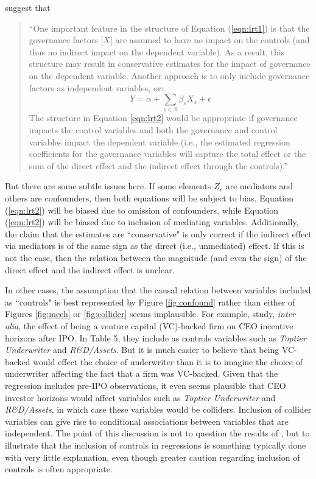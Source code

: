 \documentclass[11pt,reqno]{amsart}
\begin{document}
\citet{Larcker:2011bw} suggest that 
\begin{quote}
``One important feature in the structure of Equation (\ref{eqn:lrt1}) is that the governance factors [$X$] are assumed to have no impact on the controls (and thus no indirect impact on the dependent variable). 
As a result, this structure may result in conservative estimates for the impact of governance on the dependent variable. Another approach is to only include governance factors as independent variables, or:
\begin{equation}
Y = \alpha + \sum_{s \in S} \beta_s X_s + \epsilon \label{eqn:lrt2}
\end{equation}
The structure in Equation \ref{eqn:lrt2} would be appropriate if governance impacts the control variables and both the governance and control variables impact the dependent variable (i.e., the estimated regression coefficients for the governance variables will capture the total effect or the sum of the direct effect and the indirect effect through the controls).''
\end{quote}

But there are some subtle issues here.
If some elements $Z_r$ are mediators and others are confounders, then both equations will be subject to bias. 
Equation (\ref{eqn:lrt2}) will be biased due to omission of confounders, while Equation (\ref{eqn:lrt2})  will be biased due to inclusion of mediating variables.
Additionally, the claim that the estimates are ``conservative" is only correct if the indirect effect via mediators is of the same sign as the direct (i.e., unmediated) effect. 
If this is not the case, then the relation between the magnitude (and even the sign) of the direct effect and the indirect effect is unclear.

In other cases, the assumption that the causal relation between variables included as ``controls" is best represented by Figure \ref{fig:confound} rather than either of Figures \ref{fig:mech} or \ref{fig:collider} seems implausible.
For example, \citet{Cadman:2014cr} study, \emph{inter alia}, the effect of being a venture capital (VC)-backed firm on CEO incentive horizons after IPO.
In Table 5, they include as controls variables such as \emph{Toptier Underwriter} and \emph{R\&D/Assets}.
But it is much easier to believe that being VC-backed would effect the choice of underwriter than it is to imagine the choice of underwriter affecting the fact that a firm was VC-backed.
Given that the regression includes pre-IPO observations, it even seems plausible that CEO investor horizons would affect variables such as \emph{Toptier Underwriter} and \emph{R\&D/Assets}, in which case these variables would be colliders.
Inclusion of collider variables can give rise to conditional associations between variables that are independent.
The point of this discussion is not to question the results of  \citet{Cadman:2014cr}, but to illustrate that the inclusion of controls in regressions is something typically done with very little explanation, even though greater caution regarding inclusion of controls is often appropriate.
\end{document}

